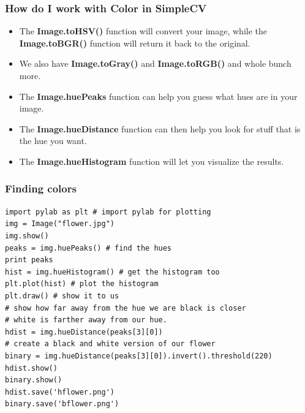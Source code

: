 \documentclass{beamer}
\begin{document}
\begin{frame}
\frametitle{How do I work with Color in SimpleCV}
\begin{itemize}
\item The \textbf{Image.toHSV()} function will convert your image, while the
\textbf{Image.toBGR()} function will return it back to the original.
\item We also have \textbf{Image.toGray()} and \textbf{Image.toRGB()}
  and whole bunch more. 
\item The \textbf{Image.huePeaks} function can help you guess what
  hues are in your image.
\item The \textbf{Image.hueDistance} function can then help you look
  for stuff that is the hue you want. 
\item The \textbf{Image.hueHistogram} function will let you visualize
  the results. 
\end{itemize}
\end{frame}
\begin{frame}[fragile] 
\frametitle{Finding colors}
\begin{example}
\begin{verbatim}
import pylab as plt # import pylab for plotting
img = Image("flower.jpg")
img.show()
peaks = img.huePeaks() # find the hues
print peaks
hist = img.hueHistogram() # get the histogram too
plt.plot(hist) # plot the histogram
plt.draw() # show it to us
# show how far away from the hue we are black is closer
# white is farther away from our hue.
hdist = img.hueDistance(peaks[3][0]) 
# create a black and white version of our flower
binary = img.hueDistance(peaks[3][0]).invert().threshold(220)
hdist.show()
binary.show()
hdist.save('hflower.png')
binary.save('bflower.png')
\end{verbatim}
\end{example}
\end{frame}
\end{document}
